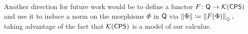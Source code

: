 \begin{comment}
Given a tuple of matrices 
\[
A = (A_1, \ldots, A_s) \in \mathcal{M}^{n_1} \oplus \cdots \oplus \mathcal{M}^{n_s},
\]
we say that $A$ is \emph{positive} if each matrix $A_i$ is positive. The \emph{trace} of such a tuple is then defined as the sum of the traces of its components:
\[
\tr(A) = \sum_i \tr(A_i).
\]

\begin{definition} \label{def:catQ}
The category $\catQ$ is defined as follows:
\begin{itemize}
  \item An object is a signature $\sigma= n_1, \ldots, n_s$. We denote these signatures by the Greek letters $\sigma, \tau$ and $\mu$ and each signature $\sigma$ is associated with the complex vector space
  \[
  \mathcal{M}_\sigma \coloneqq \mathcal{M}_{n_1} \oplus \cdots \oplus \mathcal{M}_{n_s}.
  \]
  
  \item  For signatures $\sigma = (n_1, \ldots, n_s)$ and $\tau = (m_1, \ldots, m_t)$, a morphism $\Phi: \sigma \to \tau$ is a linear map $\Phi: \mathcal{M}_\sigma \to \mathcal{M}_\tau$ satisfying:
    \begin{enumerate}
        \item \emph{Complete positivity:} For every signature $\mu$, the extended map
        \[
        \mathrm{id}_{\mu} \otimes \Phi: \mathcal{M}_{\mu \otimes \sigma} \to \mathcal{M}_{\mu \otimes \tau}
        \]
        preserves positivity (maps positive tuples to positive tuples).
        
        \item It is \emph{trace non-increasing:}
        \(
        \tr(\Phi(A)) \leq \tr(A),
        \)
        for all positive  $A \in \mathcal{M}_\sigma$.
    \end{enumerate}
\end{itemize}
\end{definition}
\end{comment}

Another direction for future work would be to define a functor 
\( F \colon \mathsf{Q} \to \mathcal{K}(\mathsf{CPS}) \) 
and use it to induce a norm on the morphisms \(\Phi\) in \(\mathsf{Q}\) via 
\( \|\Phi\| \coloneqq \left\lVert F(\Phi) \right\rVert_{\diamondsuit}, \) 
taking advantage of the fact that \(\mathcal{K}(\mathsf{CPS})\) is a model of our calculus.


